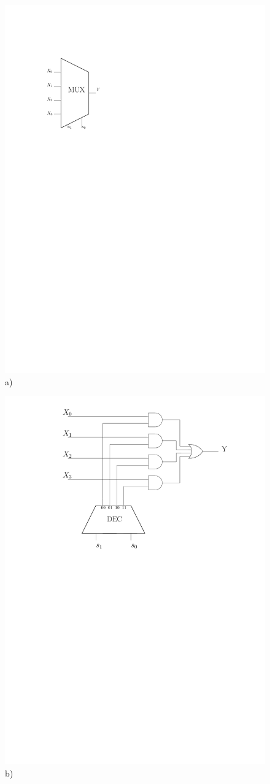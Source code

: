 \begin{figure}[htbp]
   \begin{minipage}[c]{.46\linewidth}
\includegraphics[width=0.5\linewidth]{Figs/mux.pdf} \\\centering a)
   \end{minipage} \hfill
   \begin{minipage}[c]{.46\linewidth}
\includegraphics[width=\linewidth]{Figs/mux_inner.pdf}\\\centering b)

\end{minipage}
\end{figure}
